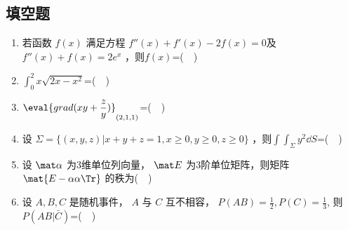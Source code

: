 \subsection{填空题}
\begin{enumerate}
\item 若函数 $f(x)$  满足方程 $f''(x)+f'(x)-2f(x)=0$及$f''(x)+f(x)=2e^x$ ，则$f(x)$=($\quad$)
\item $\displaystyle \int_{0}^{2} x\sqrt{2x-x^2}$=($\quad$)
\item $\displaystyle \eval{ grad(xy+\frac{z}{y})}_{(2,1,1)}$=($\quad$)
\item  设 $\Sigma=\{(x,y,z)|x+y+z=1,x\ge 0,y \ge 0,z \ge 0\}$  ，则$\displaystyle \int \int_\Sigma y^2\dd{S}$=($\quad$)
\item 设 $\mat \alpha$ 为3维单位列向量， $\mat E$ 为3阶单位矩阵，则矩阵 $\mat {E-\alpha\alpha \Tr}$ 的秩为($\quad$)
\item 设 $A,B,C$ 是随机事件， $A$ 与 $C$ 互不相容， $P(AB)=\frac{1}{2},P(C)=\frac{1}{3}$,  则 $P(AB|\bar C)$=($\quad$)
\end{enumerate}
